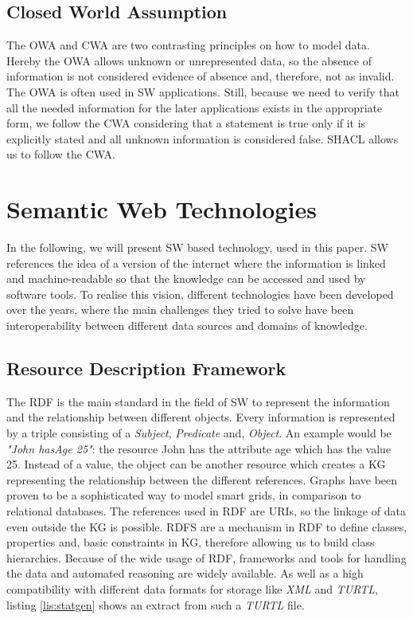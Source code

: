 \subsection{Closed World Assumption}
\label{subsec:cwa}
The \ac{OWA} and \ac{CWA} are two contrasting principles on how to model data.
Hereby the \ac{OWA} allows unknown or unrepresented data, so the absence of information is not considered evidence of absence and, therefore, not as invalid.
The \ac{OWA} is often used in \ac{SW} applications.
Still, because we need to verify that all the needed information for the later applications exists in the appropriate form, we follow the \ac{CWA} considering that a statement is true only if it is explicitly stated and all unknown information is considered false.
\ac{SHACL} allows us to follow the \ac{CWA}.


\section{Semantic Web Technologies}
\label{sec:technologies}

In the following, we will present \ac{SW} based technology, used in this paper.
\ac{SW} references the idea of a version of the internet where the information is linked and machine-readable so that the knowledge can be accessed and used by software tools.
To realise this vision, different technologies have been developed over the years, where the main challenges they tried to solve have been interoperability between different data sources and domains of knowledge.

\subsection{Resource Description Framework}
\label{subsec:rdf}

The \ac{RDF} is the main standard in the field of \ac{SW} to represent the information and the relationship between different objects.
Every information is represented by a triple consisting of a \textit{Subject}, \textit{Predicate} and, \textit{Object}.
An example would be \textit{"John hasAge 25"}: the resource John has the attribute age which has the value 25.
Instead of a value, the object can be another resource which creates a \ac{KG} representing the relationship between the different references.
Graphs have been proven to be a sophisticated way to model smart grids, in comparison to relational databases\cite{klaer_sg3_2020,jain_semantic_2023}.
The references used in \ac{RDF} are \ac{URI}s, so the linkage of data even outside the \ac{KG} is possible.
\ac{RDFS} are a mechanism in \ac{RDF} to define classes, properties and, basic constraints in \ac{KG}, therefore allowing us to build class hierarchies.
Because of the wide usage of \ac{RDF}, frameworks and tools for handling the data and automated reasoning are widely available.
As well as a high compatibility with different data formats for storage like \textit{XML} and \textit{TURTL}, listing \ref{lis:statgen} shows an extract from such a \textit{TURTL} file.

